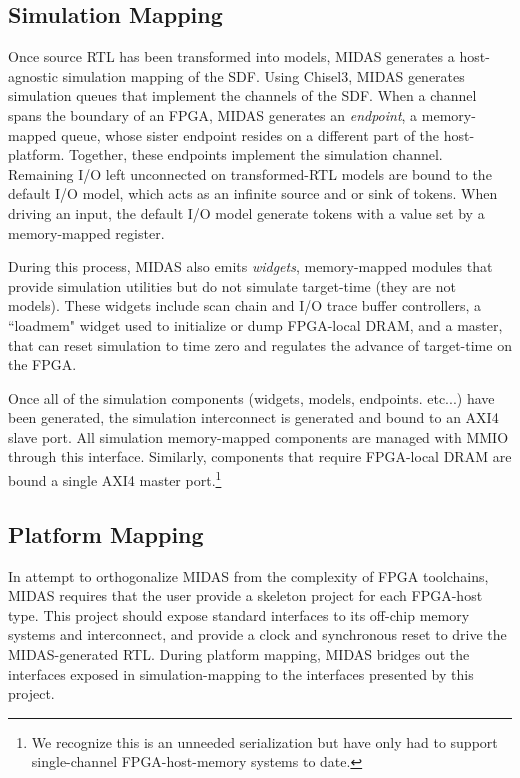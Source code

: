 \subsection{Simulation Mapping}

Once source RTL has been transformed into models, MIDAS generates a
host-agnostic simulation mapping of the SDF. Using Chisel3, MIDAS generates
simulation queues that implement the channels of the SDF. When a channel spans
the boundary of an FPGA, MIDAS generates an \emph{endpoint}, a memory-mapped
queue, whose sister endpoint resides on a different part of the host-platform.
Together, these endpoints implement the simulation channel.  Remaining I/O left
unconnected on transformed-RTL models are bound to the default I/O model, which
acts as an infinite source and or sink of tokens.  When driving an input, the
default I/O model generate tokens with a value set by a memory-mapped register.

During this process, MIDAS also emits \emph{widgets}, memory-mapped modules
that provide simulation utilities but do not simulate target-time (they are not
models). These widgets include scan chain and I/O trace buffer controllers, a
``loadmem" widget used to initialize or dump FPGA-local DRAM, and a master,
that can reset simulation to time zero and regulates the advance of target-time
on the FPGA.

Once all of the simulation components (widgets, models, endpoints. etc...) have
been generated, the simulation interconnect is generated and bound to an AXI4
slave port. All simulation memory-mapped components are managed with MMIO
through this interface. Similarly, components that require FPGA-local DRAM are
bound a single AXI4 master port.\footnote{We recognize this is an unneeded serialization but have only had to support single-channel FPGA-host-memory systems to date.}

\subsection{Platform Mapping}

In attempt to orthogonalize MIDAS from the complexity of FPGA toolchains, MIDAS
requires that the user provide a skeleton project for each FPGA-host type. This
project should expose standard interfaces to its off-chip memory systems and
interconnect, and provide a clock and synchronous reset to drive the
MIDAS-generated RTL.  During platform mapping, MIDAS bridges out the interfaces
exposed in simulation-mapping to the interfaces presented by this project.


